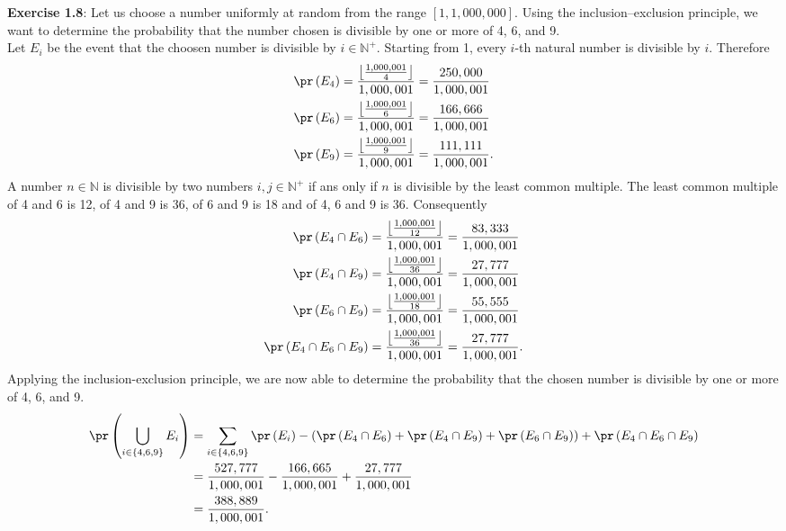 \textbf{Exercise 1.8}: Let us choose a number uniformly at random from the range
$[1, 1,000,000]$. Using the inclusion–exclusion principle, we want to determine
the probability that the number chosen is divisible by one or more of 4, 6, and 9. \\
Let $E_i$ be the event that the choosen number is divisible by $i\in \mathbb{N}^+$.
Starting from 1, every $i$-th natural number is divisible by $i$. Therefore
\begin{align*}
  \pr\left(E_4\right) &= \frac{\left\lfloor \frac{1,000,001}{4} \right\rfloor}{1,000,001} = \frac{250,000}{1,000,001} \\
  \pr\left(E_6\right) &= \frac{\left\lfloor \frac{1,000,001}{6} \right\rfloor}{1,000,001} = \frac{166,666}{1,000,001} \\
  \pr\left(E_9\right) &= \frac{\left\lfloor \frac{1,000,001}{9} \right\rfloor}{1,000,001} = \frac{111,111}{1,000,001}.
\end{align*}
A number $n \in \mathbb{N}$ is divisible by two numbers $i,j \in \mathbb{N}^+$
if ans only if $n$ is divisible by the least common multiple. The least
common multiple of 4 and 6 is 12, of 4 and 9 is 36, of 6 and 9 is 18 and of 4, 6
and 9 is 36. Consequently
\begin{align*}
  \pr\left(E_4 \cap E_6\right) &= \frac{\left\lfloor \frac{1,000,001}{12} \right\rfloor}{1,000,001} = \frac{83,333}{1,000,001} \\
  \pr\left(E_4 \cap E_9\right) &= \frac{\left\lfloor \frac{1,000,001}{36} \right\rfloor}{1,000,001} = \frac{27,777}{1,000,001} \\
  \pr\left(E_6 \cap E_9\right) &= \frac{\left\lfloor \frac{1,000,001}{18} \right\rfloor}{1,000,001} = \frac{55,555}{1,000,001} \\
  \pr\left(E_4 \cap E_6 \cap E_9\right) &= \frac{\left\lfloor \frac{1,000,001}{36} \right\rfloor}{1,000,001} = \frac{27,777}{1,000,001}.
\end{align*}
Applying the inclusion-exclusion principle, we are now able to determine the
probability that the chosen number is divisible by one or more of 4, 6, and 9.
\begin{align*}
  \pr\left(\bigcup_{i\in \{4,6,9\}}E_i\right)
    &= \sum_{i\in \{4,6,9\}} \pr\left(E_i\right) -
       \left(\pr\left(E_4 \cap E_6\right) + \pr\left(E_4 \cap E_9\right) + \pr\left(E_6 \cap E_9\right)\right) + \pr\left(E_4 \cap E_6 \cap E_9 \right) \\
    &= \frac{527,777}{1,000,001} - \frac{166,665}{1,000,001} + \frac{27,777}{1,000,001} \\
    &= \frac{388,889}{1,000,001}.
\end{align*}
